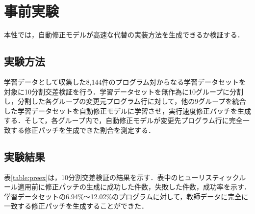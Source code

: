 \documentclass[submit,ses,noauthor]{ipsj}
\begin{document}
\section{事前実験}\label{sec:pre}

本性では，自動修正モデルが高速な代替の実装方法を生成できるか検証する．

\subsection{実験方法}

学習データとして収集した8,144件のプログラム対からなる学習データセットを対象に10分割交差検証を行う．学習データセットを無作為に10グループに分割し，分割した各グループの変更元プログラム行に対して，他の9グループを統合した学習データセットを自動修正モデルに学習させ，実行速度修正パッチを生成する．そして，各グループ内で，自動修正モデルが変更先プログラム行に完全一致する修正パッチを生成できた割合を測定する．

\subsection{実験結果}

表\ref{table:preex}は，10分割交差検証の結果を示す．表中のヒューリスティックルール適用前に修正パッチの生成に成功した件数，失敗した件数，成功率を示す．学習データセットの6.94\%〜12.02\%のプログラムに対して，教師データに完全に一致する修正パッチを生成することができた．
\end{document}
